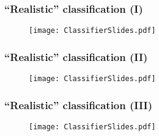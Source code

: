 \documentclass[hyperref={colorlinks=true}]{beamer}
\begin{document}
\begin{frame}%
  \frametitle{``Realistic'' classification (I)}

  \vspace{-0.0cm}

  \begin{figure}
    \centering 
    \texttt{[image: ClassifierSlides.pdf]}
  \end{figure}

    
\end{frame}


\begin{frame}%
  \frametitle{``Realistic'' classification (II)}

  \vspace{-0.0cm}

  \begin{figure}
    \centering 
    \texttt{[image: ClassifierSlides.pdf]}
  \end{figure}

    
\end{frame}


\begin{frame}%
  \frametitle{``Realistic'' classification (III)}

  \vspace{-0.0cm}

  \begin{figure}
    \centering 
    \texttt{[image: ClassifierSlides.pdf]}
  \end{figure}

    
\end{frame}
  
\end{document}
